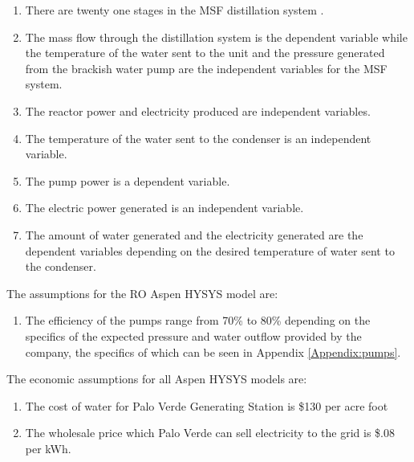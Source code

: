 \begin{enumerate}
\item There are twenty one stages in the MSF distillation system \cite{Bodalal2010}.
\item The mass flow through the distillation system is the dependent variable while the temperature of the water sent to the unit and the pressure generated from the brackish water pump are the independent variables for the MSF system.
\item The reactor power and electricity produced are independent variables.
\item The temperature of the water sent to the condenser is an independent variable.
\item The pump power is a dependent variable.
\item The electric power generated is an independent variable.
\item The amount of water generated and the electricity generated are the dependent variables depending on the desired temperature of water sent to the condenser.
\end{enumerate}

The assumptions for the RO Aspen HYSYS model are:

\begin{enumerate}
\item The efficiency of the pumps range from 70\% to 80\% depending on the specifics of the expected pressure and water outflow provided by the company, the specifics of which can be seen in Appendix \ref{Appendix:pumps}.
\end{enumerate}

The economic assumptions for all Aspen HYSYS models are:
\begin{enumerate}
\item The cost of water for Palo Verde Generating Station is \$130 per acre foot \cite{Brown2018}
\item The wholesale price which Palo Verde can sell electricity to the grid is \$.08 per kWh.
\end{enumerate}

